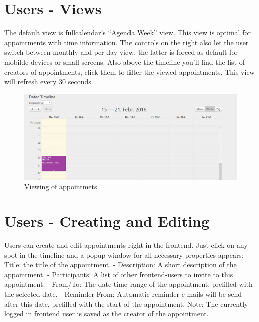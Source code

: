\documentclass[a4paper,10pt,english]{sphinxmanual}
\begin{document}
\section{Users - Views}
\label{UsersManual/Index:users-views}
The default view is fullcalendar's ``Agenda Week'' view. This view is optimal for appointments with time information.
The controls on the right also let the user switch between monthly and per day view, the latter is forced as default for mobilde devices or small screens.
Also above the timeline you'll find the list of creators of appointments, click them to filter the viewed appointments.
This view will refresh every 30 seconds.
\begin{figure}[htbp]
\centering
\capstart

\includegraphics{datec_timeline_02_views1.png}
\caption{Viewing of appointmets}\end{figure}


\section{Users - Creating and Editing}
\label{UsersManual/Index:users-creating-and-editing}
Users can create and edit appointments right in the frontend. Just click on any spot in the timeline and a popup window for all necessary properties appears:
- Title: the title of the appointment.
- Description: A short description of the appointment.
- Participants: A list of other frontend-users to invite to this appointment.
- From/To: The date-time range of the appointment, prefilled with the selected date.
- Reminder From: Automatic reminder e-mails will be send after this date, prefilled with the start of the appointment.
Note: The currently logged in frontend user is saved as the creator of the appointment.
\end{document}
